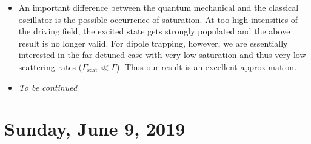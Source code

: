 \documentclass{report}
\theoremstyle{definition}
\begin{document}
\begin{itemize}
\begin{itemize}
		\item An important difference between the quantum mechanical and the classical oscillator is the possible occurrence of saturation. At too high intensities of the driving field, the excited state gets strongly populated and the above result is no longer valid. For dipole trapping, however, we are essentially interested in the far-detuned case with very low saturation and thus very
		low scattering rates ($\Gamma_\text{scat} \ll \Gamma$). Thus our result is an excellent approximation. 
		
		
		\item \textit{To be continued}
		
		
	\end{itemize}





\end{itemize}



\section{Sunday, June 9, 2019}
\end{document}
